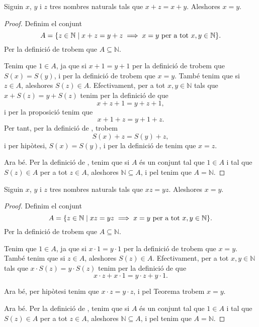 \documentclass[../Apunts.tex]{subfiles}
\begin{document}
	\begin{theorem}
		\label{thm:podem tatxar per la suma nombres naturals}
		Siguin \(x\), \(y\) i \(z\) tres nombres naturals tals que \(x+z=x+y\). Aleshores \(x=y\).
		\begin{proof}
			Definim el conjunt
			\[A=\{z\in\mathbb{N}\mid x+z=y+z\implies x=y\text{ per a tot }x,y\in\mathbb{N}\}.\]
			Per la definició de  trobem que \(A\subseteq\mathbb{N}\).
			
			Tenim que \(1\in A\), ja que si \(x+1=y+1\) per la definició de  trobem que \(S(x)=S(y)\), i per la definició de  trobem que \(x=y\). També tenim que si \(z\in A\), aleshores \(S(z)\in A\). Efectivament, per a tot \(x,y\in\mathbb{N}\) tals que \(x+S(z)=y+S(z)\) tenim per la definició de  que
			\[x+z+1=y+z+1,\]
			i per la proposició  tenim que
			\[x+1+z=y+1+z.\]
			Per tant, per la definició de , trobem
			\[S(x)+z=S(y)+z,\]
			i per hipòtesi, \(S(x)=S(y)\), i per la definició de  tenim que \(x=z\).
			
			Ara bé. Per la definició de , tenim que si \(A\) és un conjunt tal que \(1\in A\) i tal que \(S(z)\in A\) per a tot \(z\in A\), aleshores \(\mathbb{N}\subseteq A\), i pel  tenim que \(A=\mathbb{N}\).
		\end{proof}
	\end{theorem}
	\begin{theorem}
		\label{thm:podem tatxar pel producte nombres naturals}
		Siguin \(x\), \(y\) i \(z\) tres nombres naturals tals que \(xz=yz\). Aleshores \(x=y\).
		\begin{proof}
			Definim el conjunt
			\[A=\{z\in\mathbb{N}\mid xz=yz\implies x=y\text{ per a tot }x,y\in\mathbb{N}\}.\]
			Per la definició de  trobem que \(A\subseteq\mathbb{N}\).
			
			Tenim que \(1\in A\), ja que si \(x\cdot1=y\cdot1\) per la definició de  trobem que \(x=y\). També tenim que si \(z\in A\), aleshores \(S(z)\in A\). Efectivament, per a tot \(x,y\in\mathbb{N}\) tals que \(x\cdot S(z)=y\cdot S(z)\) tenim per la definició de \myref{def:producte de nombres naturals} que
			\[x\cdot z+x\cdot1=y\cdot z+y\cdot1.\]
			
			Ara bé, per hipòtesi tenim que \(x\cdot z=y\cdot z\), i pel Teorema  trobem \(x=y\).
			
			Ara bé. Per la definició de , tenim que si \(A\) és un conjunt tal que \(1\in A\) i tal que \(S(z)\in A\) per a tot \(z\in A\), aleshores \(\mathbb{N}\subseteq A\), i pel  tenim que \(A=\mathbb{N}\).
		\end{proof}
	\end{theorem}
\end{document}
